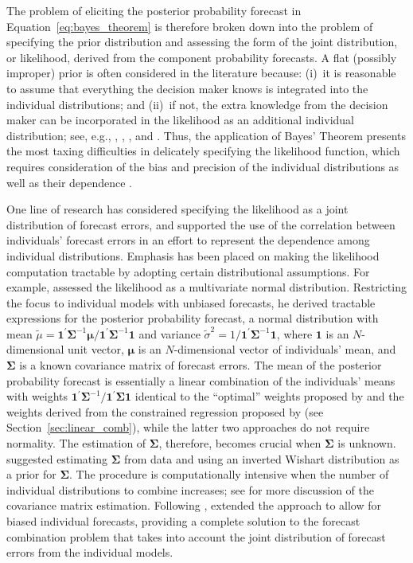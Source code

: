 \documentclass[a4paper,11pt]{article}
\begin{document}
The problem of eliciting the posterior probability forecast in Equation~\eqref{eq:bayes_theorem} is therefore broken down into the problem of specifying the prior distribution and assessing the form of the joint distribution, or likelihood, derived from the component probability forecasts. A flat (possibly improper) prior is often considered in the literature because: (i)~it is reasonable to assume that everything the decision maker knows is integrated into the individual distributions; and (ii)~if not, the extra knowledge from the decision maker can be incorporated in the likelihood as an additional individual distribution; see, e.g., \citet{Winkler1968-uw}, \citet{Clemen1993-ty}, \citet{Clemen1985-kx}, and \citet{Jouini1996-fe}. Thus, the application of Bayes' Theorem presents the most taxing difficulties in delicately specifying the likelihood function, which requires consideration of the bias and precision of the individual distributions as well as their dependence \citep{Hall2007-lh}.

One line of research has considered specifying the likelihood as a joint distribution of forecast errors, and supported the use of the correlation between individuals' forecast errors in an effort to represent the dependence among individual distributions. Emphasis has been placed on making the likelihood computation tractable by adopting certain distributional assumptions. For example, \citet{Winkler1981-bn} assessed the likelihood as a multivariate normal distribution. Restricting the focus to individual models with unbiased forecasts, he derived tractable expressions for the posterior probability forecast, a normal distribution with mean $\tilde{\mu} = \bm{1}^{\prime} \bm{\Sigma}^{-1} \bm{\mu} / \bm{1}^{\prime} \bm{\Sigma}^{-1} \bm{1}$ and variance $\tilde{\sigma}^{2} = 1/\bm{1}^{\prime} \bm{\Sigma}^{-1} \bm{1}$, where $\bm{1}$ is an $N$-dimensional unit vector, $\bm{\mu}$ is an $N$-dimensional vector of individuals' mean, and $\bm{\Sigma}$ is a known covariance matrix of forecast errors. The mean of the posterior probability forecast is essentially a linear combination of the individuals' means with weights $\bm{1}^{\prime} \bm{\Sigma}^{-1} / \bm{1}^{\prime} \bm{\Sigma} \bm{1}$ identical to the ``optimal'' weights proposed by \citet{Bates1969-yj} and the weights derived from the constrained regression proposed by \citet{Granger1984-jc} (see Section~\ref{sec:linear_comb}), while the latter two approaches do not require normality. The estimation of $\bm{\Sigma}$, therefore, becomes crucial when $\bm{\Sigma}$ is unknown. \citet{Winkler1981-bn} suggested estimating $\bm{\Sigma}$ from data and using an inverted Wishart distribution as a prior for $\bm{\Sigma}$. The procedure is computationally intensive when the number of individual distributions to combine increases; see \citet{Hall2007-lh} for more discussion of the covariance matrix estimation. Following \citet{Winkler1981-bn}, \citet{Palm1992-im} extended the approach to allow for biased individual forecasts, providing a complete solution to the forecast combination problem that takes into account the joint distribution of forecast errors from the individual models.
\end{document}
